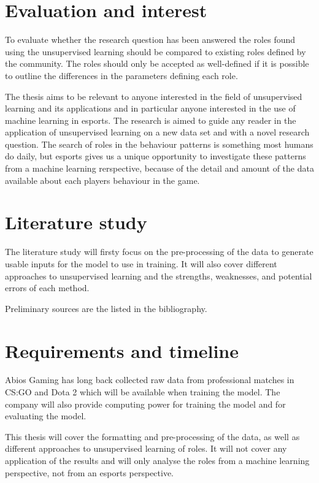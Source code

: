 \documentclass{article}
\begin{document}
\section{Evaluation and interest}
To evaluate whether the research question has been answered the roles found using the unsupervised learning should be compared to existing roles defined by the community. The roles should only be accepted as well-defined if it is possible to outline the differences in the parameters defining each role.

The thesis aims to be relevant to anyone interested in the field of unsupervised learning and its applications and in particular anyone interested in the use of machine learning in esports. The research is aimed to guide any reader in the application of unsupervised learning on a new data set and with a novel research question. The search of roles in the behaviour patterns is something most humans do daily, but esports gives us a unique opportunity to investigate these patterns from a machine learning rerspective, because of the detail and amount of the data available about each players behaviour in the game.

\section{Literature study}
The literature study will firsty focus on the pre-processing of the data to generate usable inputs for the model to use in training. It will also cover different approaches to unsupervised learning and the strengths, weaknesses, and potential errors of each method.

Preliminary sources are the listed in the bibliography. \cite{coates2011analysis} \cite{figueiredo2002unsupervised} \cite{hastie2009unsupervised}

\section{Requirements and timeline}
Abios Gaming has long back collected raw data from professional matches in CS:GO and Dota 2 which will be available when training the model. The company will also provide computing power for training the model and for evaluating the model.

This thesis will cover the formatting and pre-processing of the data, as well as different approaches to unsupervised learning of roles. It will not cover any application of the results and will only analyse the roles from a machine learning perspective, not from an esports perspective.
\end{document}
